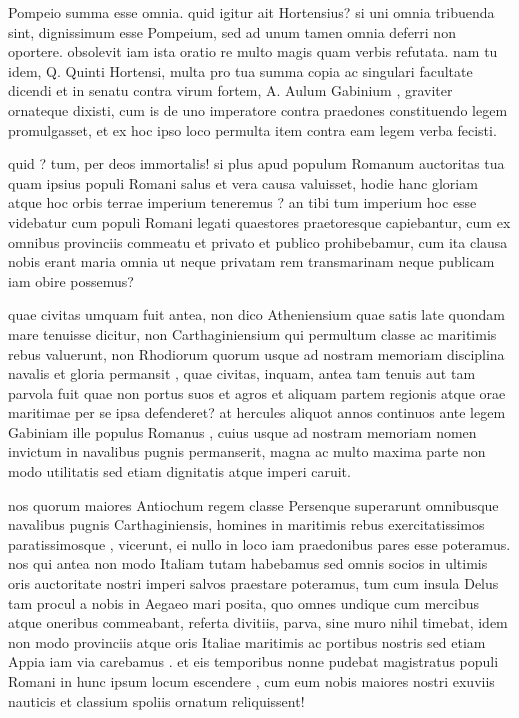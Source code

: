  Pompeio summa esse omnia. quid igitur ait Hortensius? si uni omnia tribuenda sint, dignissimum esse Pompeium, sed ad unum tamen omnia deferri non oportere. obsolevit iam ista oratio re multo magis quam verbis refutata. nam tu idem, Q. Quinti Hortensi, multa pro tua summa copia ac singulari facultate dicendi et in senatu contra virum fortem, A. Aulum Gabinium , graviter ornateque dixisti, cum is de uno imperatore contra praedones constituendo legem promulgasset, et ex hoc ipso loco permulta item contra eam legem verba fecisti.

 quid ? tum, per deos immortalis! si plus apud populum Romanum auctoritas tua quam ipsius populi Romani salus et vera causa valuisset, hodie hanc gloriam atque hoc orbis terrae imperium teneremus ? an tibi tum imperium hoc esse videbatur cum populi Romani legati quaestores praetoresque capiebantur, cum ex omnibus provinciis commeatu et privato et publico prohibebamur, cum ita clausa nobis erant maria omnia ut neque privatam rem transmarinam neque publicam iam obire possemus?

 quae civitas umquam fuit antea, non dico Atheniensium quae satis late quondam mare tenuisse dicitur, non Carthaginiensium qui permultum classe ac maritimis rebus valuerunt, non Rhodiorum quorum usque ad nostram memoriam disciplina navalis et gloria permansit , quae civitas, inquam, antea tam tenuis aut tam parvola fuit quae non portus suos et agros et aliquam partem regionis atque orae maritimae per se ipsa defenderet? at hercules aliquot annos continuos ante legem Gabiniam ille populus Romanus , cuius usque ad nostram memoriam nomen invictum in navalibus pugnis permanserit, magna ac multo maxima parte non modo utilitatis sed etiam dignitatis atque imperi caruit.

 nos quorum maiores Antiochum regem classe Persenque superarunt omnibusque navalibus pugnis Carthaginiensis, homines in maritimis rebus exercitatissimos paratissimosque , vicerunt, ei nullo in loco iam praedonibus pares esse poteramus. nos qui antea non modo Italiam tutam habebamus sed omnis socios in ultimis oris auctoritate nostri imperi salvos praestare poteramus, tum cum insula Delus tam procul a nobis in Aegaeo mari posita, quo omnes undique cum mercibus atque oneribus commeabant, referta divitiis, parva, sine muro nihil timebat, idem non modo provinciis atque oris Italiae maritimis ac portibus nostris sed etiam Appia iam via carebamus . et eis temporibus nonne pudebat magistratus populi Romani in hunc ipsum locum escendere , cum eum nobis maiores nostri exuviis nauticis et classium spoliis ornatum reliquissent!

